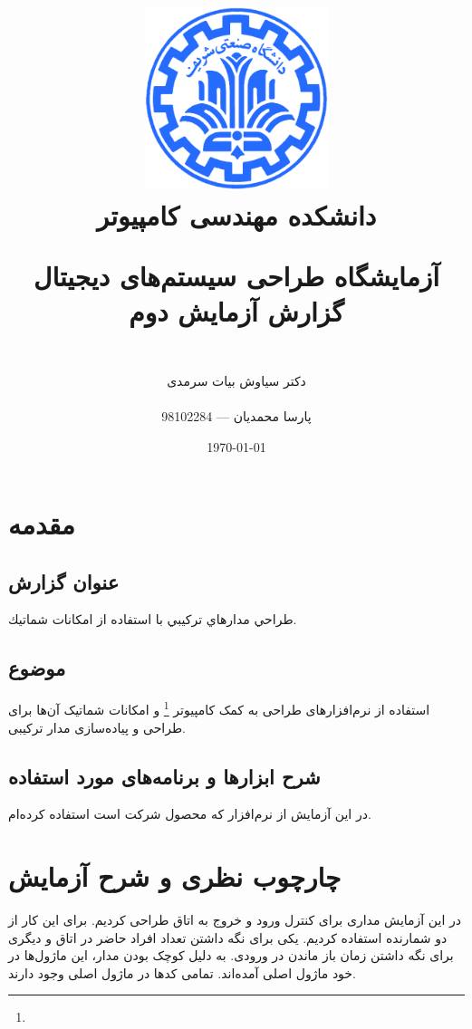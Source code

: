 \documentclass[fleqn]{article}
\title{
\includegraphics[width=0.4\textwidth]{sharif.png}\\
\normalsize{دانشکده مهندسی کامپیوتر}\\
\vspace{1cm}
	
\huge{آزمایشگاه طراحی سیستم‌های دیجیتال}
\\
\Large{گزارش آزمایش دوم}
\\
}
\author{
\\
دکتر سیاوش بیات سرمدی
\\
\\
پارسا محمدیان --- 98102284
}
\date{\today}
\begin{document}
\clearpage\maketitle
\thispagestyle{empty}

\newpage

\pagestyle{fancy}



\tableofcontents

\setcounter{page}{1}

\newpage

\section{مقدمه}

\subsection*{عنوان گزارش}
طراحي مدارهاي تركيبي با استفاده از امكانات شماتيك.
\subsection*{موضوع}
استفاده از نرم‌افزارهای طراحی به کمک کامپیوتر \footnote{} و امکانات 
شماتیک آن‌ها برای طراحی و پیاده‌سازی مدار ترکیبی.
\subsection*{شرح ابزارها و برنامه‌های مورد استفاده}
در این آزمایش از نرم‌افزار  که محصول شرکت  است 
استفاده کرده‌ام.

\section{چارچوب نظری و شرح آزمایش}
در این آزمایش مداری برای کنترل ورود و خروج به اتاق طراحی کردیم. برای این 
کار از دو شمارنده استفاده کردیم. یکی برای نگه داشتن تعداد افراد حاضر در 
اتاق و دیگری برای نگه داشتن زمان باز ماندن در ورودی. به دلیل کوچک بودن 
مدار، این ماژول‌ها در خود ماژول اصلی آمده‌اند. تمامی کدها در ماژول اصلی 
 وجود دارند.
\end{document}
